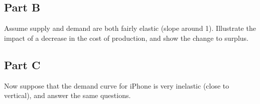 \documentclass[12pt]{article}
\begin{document}
\vspace{2mm}

\subsection*{Part B}

Assume supply and demand are both fairly elastic (slope around 1). Illustrate the impact of a decrease in the cost of production, and show the change to surplus.

\vspace{2mm}

\subsection*{Part C}

Now suppose that the demand curve for iPhone is very inelastic (close to vertical), and answer the same questions.
\end{document}
